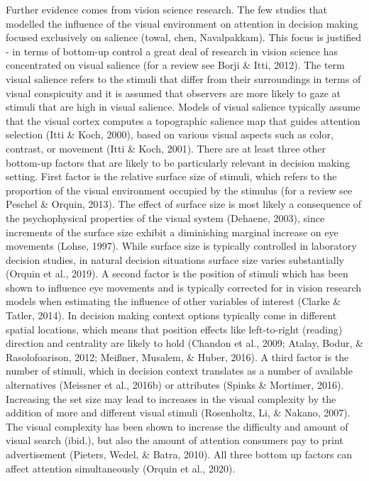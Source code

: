 \documentclass{article}
\begin{document}
Further evidence comes from vision science research. The few studies that modelled the influence of the visual environment on attention in decision making focused exclusively on salience (towal, chen, Navalpakkam). This focus is justified - in terms of bottom-up control a great deal of research in vision science has concentrated on visual salience (for a review see Borji \& Itti, 2012). The term visual salience refers to the stimuli that differ from their surroundings in terms of visual conspicuity and it is assumed that observers are more likely to gaze at stimuli that are high in visual salience. Models of visual salience typically assume that the visual cortex computes a topographic salience map that guides attention selection (Itti \& Koch, 2000), based on various visual aspects such as color, contrast, or movement (Itti \& Koch, 2001). There are at least three other bottom-up factors that are likely to be particularly relevant in decision making setting. First factor is the relative surface size of stimuli, which refers to the proportion of the visual environment occupied by the stimulus (for a review see Peschel \& Orquin, 2013). The effect of surface size is most likely a consequence of the psychophysical properties of the visual system (Dehaene, 2003), since increments of the surface size exhibit a diminishing marginal increase on eye movements (Lohse, 1997). While surface size is typically controlled in laboratory decision studies, in natural decision situations surface size varies substantially (Orquin et al., 2019). A second factor is the position of stimuli which has been shown to influence eye movements and is typically corrected for in vision research models when estimating the influence of other variables of interest (Clarke \& Tatler, 2014). In decision making context options typically come in different spatial locations, which means that position effects like left-to-right (reading) direction and centrality are likely to hold (Chandon et al., 2009; Atalay, Bodur, \& Rasolofoarison, 2012; Meißner, Musalem, \& Huber, 2016). A third factor is the number of stimuli, which in decision context translates as a number of available alternatives (Meissner et al., 2016b) or attributes (Spinks \& Mortimer, 2016). Increasing the set size may lead to increases in the visual complexity by the addition of more and different visual stimuli (Rosenholtz, Li, \& Nakano, 2007). The visual complexity has been shown to increase the difficulty and amount of visual search (ibid.), but also the amount of attention consumers pay to print advertisement (Pieters, Wedel, \& Batra, 2010). All three bottom up factors can affect attention simultaneously (Orquin et al., 2020).
\end{document}
